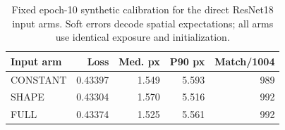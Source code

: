 \begin{table}[t]\centering\small
\caption{Fixed epoch-10 synthetic calibration for the direct ResNet18 input arms. Soft errors decode spatial expectations; all arms use identical exposure and initialization.}\label{tab:resnetbaseline}
\begin{tabular}{lrrrr}\toprule
Input arm & Loss & Med. px & P90 px & Match/1004\\\midrule
CONSTANT & 0.43397 & 1.549 & 5.593 & 989\\
SHAPE & 0.43304 & 1.570 & 5.516 & 992\\
FULL & 0.43374 & 1.525 & 5.561 & 992\\
\bottomrule\end{tabular}
\end{table}
